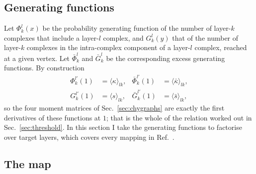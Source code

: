 \documentclass[aps,pre,twocolumn,superscriptaddress,floatfix,longbibliography]{revtex4-2}
\newcommand{\ave}[1]{\langle #1 \rangle}
\begin{document}
\subsection{Generating functions}

Let $\Phi^l_k(x)$ be the probability generating function of the number of
layer-$k$ complexes that include a layer-$l$ complex, and $G^l_k(y)$ that of the
number of layer-$k$ complexes in the intra-complex component of a layer-$l$
complex, reached at a given vertex. Let $\bar\Phi^l_k$ and $\bar G^l_k$ be the
corresponding excess generating functions. By construction
\begin{align}
  \Phi^{l\prime}_k(1)&=\ave{\kappa}_{lk}, &
  \bar\Phi^{l\prime}_k(1)&=\ave{\bar\kappa}_{lk},\nonumber\\
  G^{l\prime}_k(1)&=\ave{s}_{lk}, &
  \bar G^{l\prime}_k(1)&=\ave{\bar s}_{lk},
  \label{eq:firstderiv}
\end{align}
so the four moment matrices of Sec.~\ref{sec:chygraphs} are exactly the first
derivatives of these functions at $1$; that is the whole of the relation worked
out in Sec.~\ref{sec:threshold}. In this section I take the generating functions to factorise over target
layers, which covers every mapping in Ref.~\cite{vazquez2024comnet}.

\subsection{The map}
\end{document}
